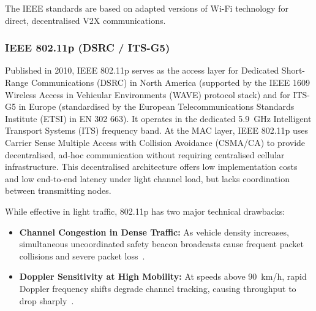 The IEEE standards are based on adapted versions of Wi-Fi technology for direct, decentralised V2X communications.

\subsubsection{IEEE 802.11p (DSRC / ITS-G5)}
Published in 2010, IEEE 802.11p serves as the access layer for Dedicated Short-Range Communications (DSRC) in North America (supported by the IEEE 1609 Wireless Access in Vehicular Environments (WAVE) protocol stack) and for ITS-G5 in Europe (standardised by the European Telecommunications Standards Institute (ETSI) in EN 302 663).
It operates in the dedicated 5.9~GHz Intelligent Transport Systems (ITS) frequency band.
At the MAC layer, IEEE 802.11p uses Carrier Sense Multiple Access with Collision Avoidance (CSMA/CA) to provide decentralised, ad-hoc communication without requiring centralised cellular infrastructure.
This decentralised architecture offers low implementation costs and low end-to-end latency under light channel load, but lacks coordination between transmitting nodes.

While effective in light traffic, 802.11p has two major technical drawbacks:
\begin{itemize}
    \item \textbf{Channel Congestion in Dense Traffic:} As vehicle density increases, simultaneous uncoordinated safety beacon broadcasts cause frequent packet collisions and severe packet loss~\cite{ansari2021joint}.
    \item \textbf{Doppler Sensitivity at High Mobility:} At speeds above 90~km/h, rapid Doppler frequency shifts degrade channel tracking, causing throughput to drop sharply~\cite{benkirane2018performance}.
\end{itemize}

